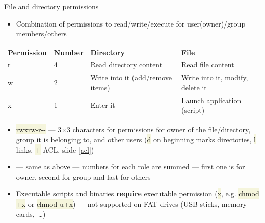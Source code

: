 \documentclass[compress, xelatex, 11pt, xcolor=svgnames, aspectratio=169, url={hyphens, lowtilde}]{beamer}
\renewcommand{\texttt}[1]{\colorbox{Beige}{{\ttfamily #1}}}
\begin{document}
\begin{frame}{File and directory permissions}
	\label{permissions}
	\begin{itemize}
		\item Combination of permissions to read/write/execute for user(owner)/group members/others
	\end{itemize}
	\begin{center}
		\begin{tabular}{llll}
			\textbf{Permission} & \textbf{Number} & \textbf{Directory} & \textbf{File}\\
			r & 4 & Read directory content & Read file content\\
			w & 2 & Write into it (add/remove items) & Write into it, modify, delete it\\
			x & 1 & Enter it & Launch application (script)
		\end{tabular}
	\end{center}
	\begin{itemize}
		\item \texttt{rwxrw-r-{-}} --- 3$\times$3 characters for permissions for owner of the file/directory, group it is belonging to, and other users (\texttt{d} on beginning marks directories, \texttt{l} links, \texttt{+} ACL, slide \ref{acl})
		\item \texttt{764} --- same as above --- numbers for each role are summed --- first one is for owner, second for group and last for others
		\item Executable scripts and binaries \textbf{require} executable permission (\texttt{x}, e.g. \texttt{chmod +x} or \texttt{chmod u+x}) --- not supported on FAT drives (USB sticks, memory cards,~\ldots)
	\end{itemize}
\end{frame}
\end{document}
